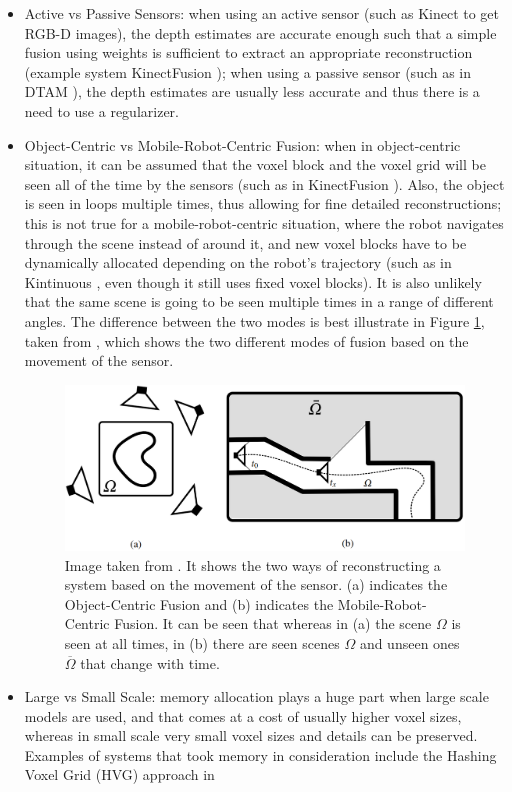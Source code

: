 \documentclass[11pt]{article}
\begin{document}
\begin{itemize}
\item Active vs Passive Sensors: when using an active sensor (such as Kinect to get RGB-D images), the depth estimates are accurate enough such that a simple fusion using weights is sufficient to extract an appropriate reconstruction (example system KinectFusion \cite{kinectfusion}); when using a passive sensor (such as in DTAM \cite{DTAM}), the depth estimates are usually less accurate and thus there is a need to use a regularizer.
\item Object-Centric vs Mobile-Robot-Centric Fusion: when in object-centric situation, it can be assumed that the voxel block and the voxel grid will be seen all of the time by the sensors (such as in KinectFusion \cite{kinectfusion}). Also, the object is seen in loops multiple times, thus allowing for fine detailed reconstructions; this is not true for a mobile-robot-centric situation, where the robot navigates through the scene instead of around it, and new voxel blocks have to be dynamically allocated depending on the robot's trajectory (such as in Kintinuous \cite{kintinuous}, even though it still uses fixed voxel blocks). It is also unlikely that the same scene is going to be seen multiple times in a range of different angles. The difference between the two modes is best illustrate in Figure \ref{fig:RobotVsObjectCent}, taken from \cite{TannerFSR2015}, which shows the two different modes of fusion based on the movement of the sensor.

\begin{figure}[h]
	\includegraphics[width=\linewidth]{RobotVsObjectCent}
	\caption{Image taken from \cite{TannerFSR2015}. It shows the two ways of reconstructing a system based on the movement of the sensor. (a) indicates the Object-Centric Fusion and (b) indicates the Mobile-Robot-Centric Fusion. It can be seen that whereas in (a) the scene $\Omega$ is seen at all times, in (b) there are seen scenes $\Omega$ and unseen ones $\overline{\Omega}$ that change with time.}
	\label{fig:RobotVsObjectCent}
\end{figure}


\item Large vs Small Scale: memory allocation plays a huge part when large scale models are used, and that comes at a cost of usually higher voxel sizes, whereas in small scale very small voxel sizes and details can be preserved. Examples of systems that took memory in consideration include the Hashing Voxel Grid (HVG) approach in \cite{HVG}
\end{itemize}
	
\end{document}

